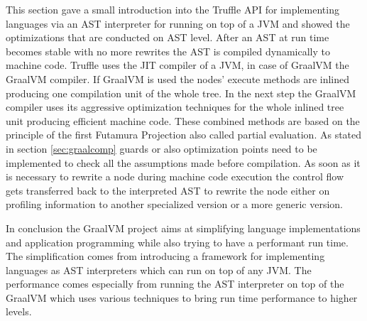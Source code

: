 This section gave a small introduction into the Truffle API for implementing languages via an AST interpreter for running on top of a JVM and showed the optimizations that are conducted on AST level. After an AST at run time becomes stable with no more rewrites the AST is compiled dynamically to machine code. Truffle uses the JIT compiler of a JVM, in case of GraalVM the GraalVM compiler. If GraalVM is used the nodes' execute methods are inlined producing one compilation unit of the whole tree. In the next step the GraalVM compiler uses its aggressive optimization techniques for the whole inlined tree unit producing efficient machine code. These combined methods are based on the principle of the first Futamura Projection also called partial evaluation. \cite{FutaPart} As stated in section \ref{sec:graalcomp} guards or also optimization points need to be implemented to check all the assumptions made before compilation. As soon as it is necessary to rewrite a node during machine code execution the control flow gets transferred back to the interpreted AST to rewrite the node either on profiling information to another specialized version or a more generic version. \cite{ChambDeopt}

In conclusion the GraalVM project aims at simplifying language implementations and application programming while also trying to have a performant run time. The simplification comes from introducing a framework for implementing languages as AST interpreters which can run on top of any JVM. The performance comes especially from running the AST interpreter on top of the GraalVM which uses various techniques to bring run time performance to higher levels.
